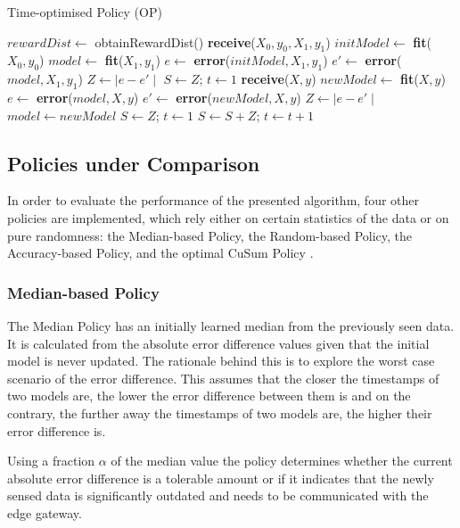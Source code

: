 \documentclass{mpaper}
\begin{document}
\begin{algorithm}
\caption{Time-optimised Policy (OP)}\label{polOP}
\begin{algorithmic}
\State $rewardDist \gets$ obtainRewardDist() 
\State \textbf{receive}($X_0, y_0, X_1, y_1$)
\State $initModel \gets$ \textbf{fit}($X_0, y_0$)
\State $model \gets$ \textbf{fit}($X_1, y_1$)
\State $e \gets$ \textbf{error}($initModel,X_1,y_1$)
\State $e' \gets$ \textbf{error}($model,X_1,y_1$)
\State $Z \gets \mid e - e' \mid$
\State $S \gets Z$; $t \gets 1$
    \State \textbf{receive}($X, y$)
    \State $newModel \gets$ \textbf{fit}($X,y$)
    \State $e \gets$ \textbf{error}($model,X,y$)
    \State $e' \gets$ \textbf{error}($newModel,X,y$)
    \State $Z \gets \mid e - e' \mid$
        \State $model \gets newModel$ 
        \State $S \gets Z$; $t \gets 1$
    \Else
        \State $S \gets S + Z$; $t \gets t + 1$
    \EndIf
\EndWhile
\end{algorithmic}
\end{algorithm}
\newpage
\subsection{Policies under Comparison}
In order to evaluate the performance of the presented algorithm, four other policies are implemented, which rely either on certain statistics of the data or on pure randomness: the Median-based Policy, the Random-based Policy, the Accuracy-based Policy, and the optimal CuSum Policy \cite{cusum_pierre}.

\subsubsection{Median-based Policy}
The Median Policy has an initially learned median from the previously seen data. It is calculated from the absolute error difference values given that the initial model is never updated. 
The rationale behind this is to explore the worst case scenario of the error difference. This assumes that the closer the timestamps of two models are, the lower the error difference between them is and on the contrary, the further away the timestamps of two models are, the higher their error difference is.

Using a fraction $\alpha$ of the median value the policy determines whether the current absolute error difference is a tolerable amount or if it indicates that the newly sensed data is significantly outdated and needs to be communicated with the edge gateway.
\end{document}
